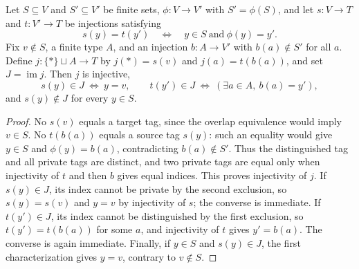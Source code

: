 \begin{lemma}
Let $S\subseteq V$ and $S'\subseteq V'$ be finite sets,
$\phi:V\to V'$ with $S'=\phi(S)$, and let $s:V\to T$ and $t:V'\to T$
be injections satisfying
\[
 s(y)=t(y')\quad\Longleftrightarrow\quad y\in S\ \text{and}\ \phi(y)=y'.
\]
Fix $v\notin S$, a finite type $A$, and an injection $b:A\to V'$ with
$b(a)\notin S'$ for all $a$. Define
$j:\{*\}\sqcup A\to T$ by $j(*)=s(v)$ and $j(a)=t(b(a))$, and set
$J=\operatorname{im}j$. Then $j$ is injective,
\[
 s(y)\in J\ \Longleftrightarrow\ y=v,\qquad
 t(y')\in J\ \Longleftrightarrow\ (\exists a\in A,\ b(a)=y'),
\]
and $s(y)\notin J$ for every $y\in S$.
\end{lemma}
\begin{proof}
No $s(v)$ equals a target tag, since the overlap equivalence would imply
$v\in S$. No $t(b(a))$ equals a source tag $s(y)$: such an equality
would give $y\in S$ and $\phi(y)=b(a)$, contradicting $b(a)\notin S'$.
Thus the distinguished tag and all private tags are distinct, and two
private tags are equal only when injectivity of $t$ and then $b$ gives
equal indices. This proves injectivity of $j$.
If $s(y)\in J$, its index cannot be private by the second exclusion,
so $s(y)=s(v)$ and $y=v$ by injectivity of $s$; the converse is immediate.
If $t(y')\in J$, its index cannot be distinguished by the first
exclusion, so $t(y')=t(b(a))$ for some $a$, and injectivity of $t$ gives
$y'=b(a)$. The converse is again immediate. Finally, if $y\in S$ and
$s(y)\in J$, the first characterization gives $y=v$, contrary to
$v\notin S$.
\end{proof}
